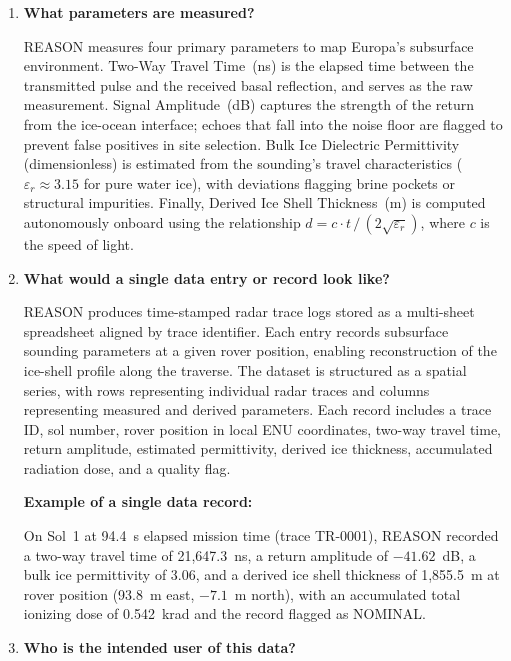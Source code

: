 \documentclass[11pt]{article}
\begin{document}
\begin{enumerate}[label=\Roman*., leftmargin=2.5em, itemsep=0.75em]

    \item \textbf{What parameters are measured?}

    REASON measures four primary parameters to map Europa's subsurface environment.
    Two-Way Travel Time~(ns) is the elapsed time between the transmitted pulse and the
    received basal reflection, and serves as the raw measurement. Signal
    Amplitude~(dB) captures the strength of the return from the ice-ocean interface;
    echoes that fall into the noise floor are flagged to prevent false positives in site
    selection. Bulk Ice Dielectric Permittivity (dimensionless) is estimated from the
    sounding's travel characteristics ($\varepsilon_r \approx 3.15$ for pure water ice),
    with deviations flagging brine pockets or structural impurities. Finally, Derived Ice
    Shell Thickness~(m) is computed autonomously onboard using the relationship
    $d = c \cdot t\, /\, (2\sqrt{\varepsilon_r})$, where $c$ is the speed of light.

    \item \textbf{What would a single data entry or record look like?}

    REASON produces time-stamped radar trace logs stored as a multi-sheet spreadsheet
    aligned by trace identifier. Each entry records subsurface sounding parameters at a
    given rover position, enabling reconstruction of the ice-shell profile along the
    traverse. The dataset is structured as a spatial series, with rows representing
    individual radar traces and columns representing measured and derived parameters.
    Each record includes a trace ID, sol number, rover position in local ENU coordinates,
    two-way travel time, return amplitude, estimated permittivity, derived ice thickness,
    accumulated radiation dose, and a quality flag.

    \textbf{Example of a single data record:}

    On Sol~1 at 94.4~s elapsed mission time (trace TR-0001), REASON recorded a two-way
    travel time of 21{,}647.3~ns, a return amplitude of $-41.62$~dB, a bulk ice
    permittivity of 3.06, and a derived ice shell thickness of 1{,}855.5~m at rover
    position (93.8~m east, $-7.1$~m north), with an accumulated total ionizing dose of
    0.542~krad and the record flagged as NOMINAL.

    \item \textbf{Who is the intended user of this data?}


\end{enumerate}
\end{document}
